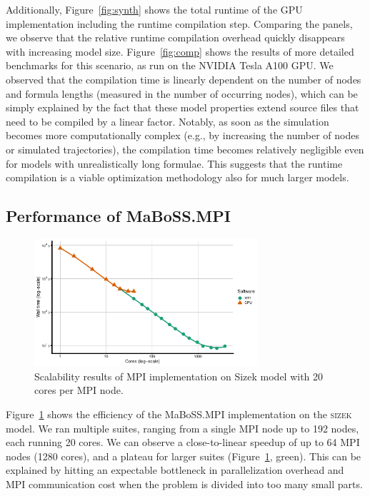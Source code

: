 \documentclass[sn-mathphys-num]{sn-jnl}%
\begin{document}
Additionally, Figure~\ref{fig:synth} shows the total runtime of the GPU implementation including the runtime compilation step. Comparing the panels, we observe that the relative runtime compilation overhead quickly disappears with increasing model size. Figure~\ref{fig:comp} shows the results of more detailed benchmarks for this scenario, as run on the NVIDIA Tesla A100 GPU. We observed that the compilation time is linearly dependent on the number of nodes and formula lengths (measured in the number of occurring nodes), which can be simply explained by the fact that these model properties extend source files that need to be compiled by a linear factor. Notably, as soon as the simulation becomes more computationally complex (e.g., by increasing the number of nodes or simulated trajectories), the compilation time becomes relatively negligible even for models with unrealistically long formulae. This suggests that the runtime compilation is a viable optimization methodology also for much larger models.

\subsection{Performance of MaBoSS.MPI}


\begin{figure}%
\centering
\includegraphics[width=3.25in]{plots/sizek_mpi.pdf}
\caption{Scalability results of MPI implementation on Sizek model with 20 cores per MPI node.}
\label{fig:sizek_results}
\end{figure}

Figure~\ref{fig:sizek_results} shows the efficiency of the MaBoSS.MPI implementation on the \textsc{sizek} model. We ran multiple suites, ranging from a single MPI node up to 192 nodes, each running 20 cores. We can observe a close-to-linear speedup of up to 64 MPI nodes (1280 cores), and a plateau for larger suites (Figure~\ref{fig:sizek_results}, green). This can be explained by hitting an expectable bottleneck in parallelization overhead and MPI communication cost when the problem is divided into too many small parts.
\end{document}
